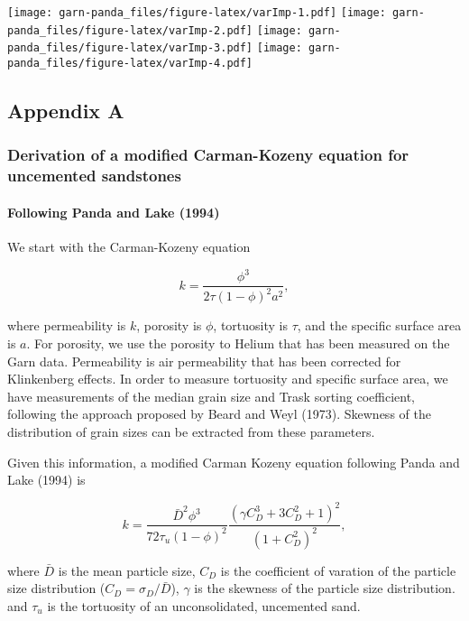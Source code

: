 \documentclass[]{article}
\let\oldparagraph\paragraph
\renewcommand{\paragraph}[1]{\oldparagraph{#1}\mbox{}}
\begin{document}
\texttt{[image: garn-panda\_files/figure-latex/varImp-1.pdf]}
\texttt{[image: garn-panda\_files/figure-latex/varImp-2.pdf]}
\texttt{[image: garn-panda\_files/figure-latex/varImp-3.pdf]}
\texttt{[image: garn-panda\_files/figure-latex/varImp-4.pdf]}

\subsection{Appendix A}\label{appendix-a}

\subsubsection{Derivation of a modified Carman-Kozeny equation for
uncemented
sandstones}\label{derivation-of-a-modified-carman-kozeny-equation-for-uncemented-sandstones}

\paragraph{Following Panda and Lake
(1994)}\label{following-panda-and-lake-1994}

We start with the Carman-Kozeny equation

\begin{equation}
k = \frac{\phi^3}{2\tau(1-\phi)^2 a^2},
\end{equation}

where permeability is \(k\), porosity is \(\phi\), tortuosity is
\(\tau\), and the specific surface area is \(a\). For porosity, we use
the porosity to Helium that has been measured on the Garn data.
Permeability is air permeability that has been corrected for Klinkenberg
effects. In order to measure tortuosity and specific surface area, we
have measurements of the median grain size and Trask sorting
coefficient, following the approach proposed by Beard and Weyl (1973).
Skewness of the distribution of grain sizes can be extracted from these
parameters.

Given this information, a modified Carman Kozeny equation following
Panda and Lake (1994) is

\begin{equation}
k = \frac{\bar{D}^2 \phi^3}{72\tau_u \left(1-\phi \right)^2} \frac{\left(\gamma C_D^3 + 3C_D^2 +1 \right)^2}{\left(1+C_D^2\right)^2},
\end{equation}

where \(\bar{D}\) is the mean particle size, \(C_D\) is the coefficient
of varation of the particle size distribution
(\(C_D=\sigma_D/\bar{D}\)), \(\gamma\) is the skewness of the particle
size distribution. and \(\tau_u\) is the tortuosity of an
unconsolidated, uncemented sand.
\end{document}
